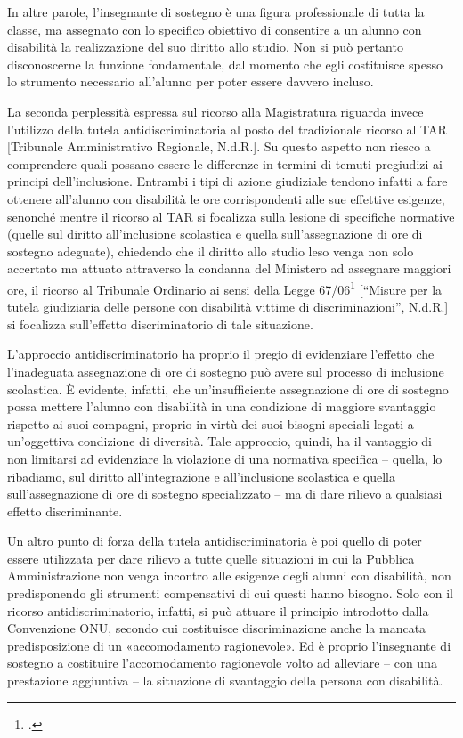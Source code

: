 In altre parole, l'insegnante di sostegno è una figura professionale di tutta la classe, ma assegnato con lo specifico obiettivo di consentire a un alunno con disabilità la realizzazione del suo diritto allo studio. Non si può pertanto disconoscerne la funzione fondamentale, dal momento che egli costituisce spesso lo strumento necessario all'alunno per poter essere davvero incluso.

La seconda perplessità espressa sul ricorso alla Magistratura riguarda invece l'utilizzo della tutela antidiscriminatoria al posto del tradizionale ricorso al TAR [Tribunale Amministrativo Regionale, N.d.R.].
Su questo aspetto non riesco a comprendere quali possano essere le differenze in termini di temuti pregiudizi ai principi dell'inclusione. Entrambi i tipi di azione giudiziale tendono infatti a fare ottenere all'alunno con disabilità le ore corrispondenti alle sue effettive esigenze, senonché mentre il ricorso al TAR si focalizza sulla lesione di specifiche normative (quelle sul diritto all'inclusione scolastica e quella sull'assegnazione di ore di sostegno adeguate), chiedendo che il diritto allo studio leso venga non solo accertato ma attuato attraverso la condanna del Ministero ad assegnare maggiori ore, il ricorso al Tribunale Ordinario ai sensi della Legge 67/06\footcite{Legge_67_2006} [“Misure per la tutela giudiziaria delle persone con disabilità vittime di discriminazioni”, N.d.R.] si focalizza sull'effetto discriminatorio di tale situazione.

L'approccio antidiscriminatorio ha proprio il pregio di evidenziare l'effetto che l'inadeguata assegnazione di ore di sostegno può avere sul processo di inclusione scolastica. È evidente, infatti, che un'insufficiente assegnazione di ore di sostegno possa mettere l'alunno con disabilità in una condizione di maggiore svantaggio rispetto ai suoi compagni, proprio in virtù dei suoi bisogni speciali legati a un'oggettiva condizione di diversità. Tale approccio, quindi, ha il vantaggio di non limitarsi ad evidenziare la violazione di una normativa specifica – quella, lo ribadiamo, sul diritto all'integrazione e all'inclusione scolastica e quella sull'assegnazione di ore di sostegno specializzato – ma di dare rilievo a qualsiasi effetto discriminante.

Un altro punto di forza della tutela antidiscriminatoria è poi quello di poter essere utilizzata per dare rilievo a tutte quelle situazioni in cui la Pubblica Amministrazione non venga incontro alle esigenze degli alunni con disabilità, non predisponendo gli strumenti compensativi di cui questi hanno bisogno. Solo con il ricorso antidiscriminatorio, infatti, si può attuare il principio introdotto dalla Convenzione ONU, secondo cui costituisce discriminazione anche la mancata predisposizione di un «accomodamento ragionevole». Ed è proprio l'insegnante di sostegno a costituire l'accomodamento ragionevole volto ad alleviare – con una prestazione aggiuntiva – la situazione di svantaggio della persona con disabilità.


